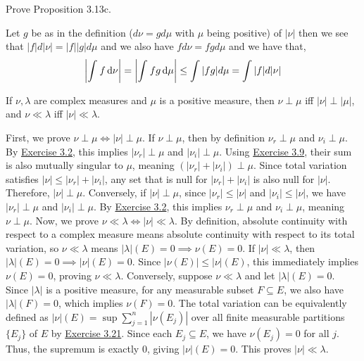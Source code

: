 \documentclass[12pt,a4paper]{article}
\begin{document}
\begin{problem}\label{prob:3-18}
Prove Proposition 3.13c.
\end{problem}
\begin{solution}
Let $g$ be as in the definition ($d\nu=gd\mu$ with $\mu$ being positive) of $|\nu|$ then we see that $|f|d|\nu|=|f||g|d\mu$ and we also have $fd\nu=fgd\mu$ and we have that,
\[
    \qty| \int_{}^{}f\,\mathrm{d}\nu|=\qty| \int_{}^{}fg\,\mathrm{d}\mu|\leq\int|fg|d\mu=\int|f|d|\nu|
\]
\end{solution}
\begin{problem}\label{prob:3-19}
If $\nu, \lambda$ are complex measures and $\mu$ is a positive measure, then $\nu\perp\mu$ iff $|\nu|\perp|\mu|$, and $\nu\ll\lambda$ iff $|\nu|\ll\lambda$.
\end{problem}
\begin{solution}
    First, we prove $\nu\perp\mu \iff |\nu|\perp\mu$. 
    If $\nu\perp\mu$, then by definition $\nu_r\perp\mu$ and $\nu_i\perp\mu$. By \hyperref[prob:3-2]{Exercise 3.2}, this implies $|\nu_r|\perp\mu$ and $|\nu_i|\perp\mu$. Using \hyperref[prob:3-9]{Exercise 3.9}, their sum is also mutually singular to $\mu$, meaning $(|\nu_r|+|\nu_i|)\perp\mu$. Since total variation satisfies $|\nu| \leq |\nu_r|+|\nu_i|$, any set that is null for $|\nu_r|+|\nu_i|$ is also null for $|\nu|$. Therefore, $|\nu|\perp\mu$.
    Conversely, if $|\nu|\perp\mu$, since $|\nu_r| \leq |\nu|$ and $|\nu_i| \leq |\nu|$, we have $|\nu_r|\perp\mu$ and $|\nu_i|\perp\mu$. By \hyperref[prob:3-2]{Exercise 3.2}, this implies $\nu_r\perp\mu$ and $\nu_i\perp\mu$, meaning $\nu\perp\mu$. 
    Now, we prove $\nu\ll\lambda \iff |\nu|\ll\lambda$. 
    By definition, absolute continuity with respect to a complex measure means absolute continuity with respect to its total variation, so $\nu\ll\lambda$ means $|\lambda|(E)=0 \implies \nu(E)=0$.
    If $|\nu|\ll\lambda$, then $|\lambda|(E)=0 \implies |\nu|(E)=0$. Since $|\nu(E)| \leq |\nu|(E)$, this immediately implies $\nu(E)=0$, proving $\nu\ll\lambda$.
    Conversely, suppose $\nu\ll\lambda$ and let $|\lambda|(E)=0$. Since $|\lambda|$ is a positive measure, for any measurable subset $F \subseteq E$, we also have $|\lambda|(F)=0$, which implies $\nu(F)=0$. The total variation can be equivalently defined as $|\nu|(E) = \sup \sum_{j=1}^n |\nu(E_j)|$ over all finite measurable partitions $\{E_j\}$ of $E$ by \hyperref[prob:3-21]{Exercise 3.21}. Since each $E_j \subseteq E$, we have $\nu(E_j)=0$ for all $j$. Thus, the supremum is exactly $0$, giving $|\nu|(E)=0$. This proves $|\nu|\ll\lambda$.
\end{solution}
\end{document}
